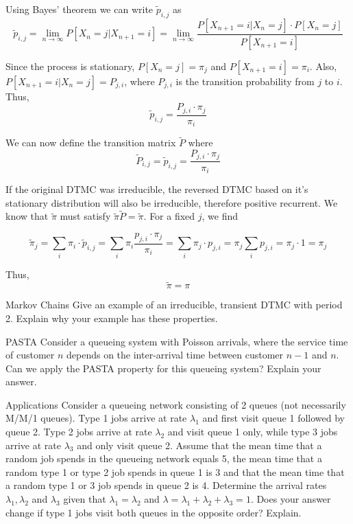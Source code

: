 \begin{solution}
  Using Bayes' theorem we can write $\tilde{p}_{i,j}$ as
  \[
    \tilde{p}_{i,j} = \lim_{n \to \infty} P[X_n = j | X_{n+1} = i] = \lim_{n \to \infty} \frac{P[X_{n+1}=i | X_n = j] \cdot P[X_n=j]}{P[X_{n+1}=i]}
  \]

  Since the process is stationary, $P[X_n=j] = \pi_j$ and $P[X_{n+1}=i] = \pi_i$. Also, $P[X_{n+1}=i | X_n = j] = P_{j,i}$, where $P_{j,i}$ is the transition probability from $j$ to $i$. Thus,
  \[
    \tilde{p}_{i,j} = \frac{P_{j,i}\cdot \pi_j}{\pi_i}
  \]

  We can now define the transition matrix $\tilde{P}$ where 
  \[
    \tilde{P}_{i,j}=\tilde{p}_{i,j} = \frac{P_{j,i}\cdot \pi_j}{\pi_i}
  \]

  If the original DTMC was irreducible, the reversed DTMC based on it's stationary distribution will also be irreducible, therefore positive recurrent.
  We know that $\tilde{\pi}$ must satisfy $\tilde{\pi}\tilde{P} = \tilde{\pi}$. For a fixed $j$, we find

  \[
    \tilde{\pi}_j = \sum_i\pi_i\cdot\tilde{p}_{i,j} = \sum_i\pi_i\frac{p_{j,i}\cdot \pi_j}{\pi_i}=\sum_i\pi_j\cdot  p_{j,i}= \pi_j\sum_ip_{j,i} = \pi_j \cdot 1 = \pi_j
  \]

  Thus,
  \[
    \boxed{\tilde{\pi} = \pi}
  \]
\end{solution}

\begin{problem}{Markov Chains}
Give an example of an irreducible, transient DTMC with period 2. Explain why your example has these properties.
\end{problem}

\begin{problem}{PASTA}
Consider a queueing system with Poisson arrivals, where the service time of customer \( n \) depends on the inter-arrival time between customer \( n - 1 \) and \( n \). Can we apply the PASTA property for this queueing system? Explain your answer.
\end{problem}

\begin{problem}{Applications}
Consider a queueing network consisting of 2 queues (not necessarily M/M/1 queues). Type 1 jobs arrive at rate \( \lambda_1 \) and first visit queue 1 followed by queue 2. Type 2 jobs arrive at rate \( \lambda_2 \) and visit queue 1 only, while type 3 jobs arrive at rate \( \lambda_3 \) and only visit queue 2. Assume that the mean time that a random job spends in the queueing network equals 5, the mean time that a random type 1 or type 2 job spends in queue 1 is 3 and that the mean time that a random type 1 or 3 job spends in queue 2 is 4. Determine the arrival rates \( \lambda_1, \lambda_2 \) and \( \lambda_3 \) given that \( \lambda_1 = \lambda_2 \) and \( \lambda = \lambda_1 + \lambda_2 + \lambda_3 = 1 \). Does your answer change if type 1 jobs visit both queues in the opposite order? Explain.
\end{problem}

